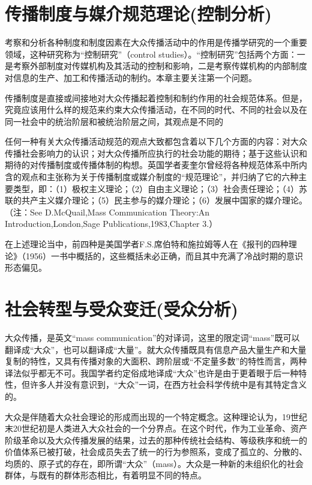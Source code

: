 \documentclass[UTF8,12pt]{ctexart}
\numberwithin{equation}{section} %
\numberwithin{figure}{section}
\numberwithin{table}{section}
\begin{document}
	\section{传播制度与媒介规范理论(控制分析)}
	考察和分析各种制度和制度因素在大众传播活动中的作用是传播学研究的一个重要领域，这种研究称为“控制研究”（control studies）。“控制研究”包括两个方面：一是考察外部制度对传媒机构及其活动的控制和影响，二是考察传媒机构的内部制度对信息的生产、加工和传播活动的制约。本章主要关注第一个问题。
	
	传播制度是直接或间接地对大众传播起着控制和制约作用的社会规范体系。但是，究竟应该用什么样的规范来约束大众传播活动，在不同的时代、不同的社会以及在同一社会中的统治阶层和被统治阶层之间，其观点是不同的
	
	任何一种有关大众传播活动规范的观点大致都包含着以下几个方面的内容：对大众传播社会影响力的认识；对大众传播所应执行的社会功能的期待；基于这些认识和期待的对传播制度或传播体制的构想。英国学者麦奎尔曾经将各种规范体系中所内含的观点和主张称为关于传播制度或媒介制度的“规范理论”，并归纳了它的六种主要类型，即：（1）极权主义理论；（2）自由主义理论；（3）社会责任理论；（4）苏联的共产主义媒介理论；（5）民主参与的媒介理论；（6）发展中国家的媒介理论。（注：See D.McQuail,Mass Communication Theory:An Introduction,London,Sage Publications,1983,Chapter 3.）
	
	在上述理论当中，前四种是美国学者F.S.席伯特和施拉姆等人在《报刊的四种理论》（1956）一书中概括的，这些概括未必正确，而且其中充满了冷战时期的意识形态偏见。
	
	\newpage
	
	\section{社会转型与受众变迁(受众分析)}
	
	大众传播，是英文“mass communication”的对译词，这里的限定词“mass”既可以翻译成“大众”，也可以翻译成“大量”。就大众传播既具有信息产品大量生产和大量复制的特性，又具有传播对象的大面积、跨阶层或“不定量多数”的特性而言，两种译法似乎都无不可。我国学者约定俗成地译成“大众”也许是由于更着眼于后一种特性，但许多人并没有意识到，“大众”一词，在西方社会科学传统中是有其特定含义的。
	
	大众是伴随着大众社会理论的形成而出现的一个特定概念。这种理论认为，19世纪末20世纪初是人类进入大众社会的一个分界点。在这个时代，作为工业革命、资产阶级革命以及大众传播发展的结果，过去的那种传统社会结构、等级秩序和统一的价值体系已被打破，社会成员失去了统一的行为参照系，变成了孤立的、分散的、均质的、原子式的存在，即所谓“大众”（mass）。大众是一种新的未组织化的社会群体，与既有的群体形态相比，有着明显不同的特点。
	
\end{document}
